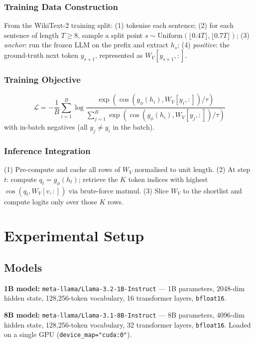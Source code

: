 \documentclass[twocolumn,10pt]{article}
\newcommand{\code}[1]{\texttt{#1}}
\begin{document}
\subsubsection{Training Data Construction}
From the WikiText-2 training split: (1) tokenise each sentence; (2) for each
sentence of length $T \geq 8$, sample a split point
$s \sim \text{Uniform}(\lfloor 0.4T\rfloor, \lfloor 0.7T\rfloor)$;
(3) \emph{anchor}: run the frozen LLM on the prefix and extract $h_s$;
(4) \emph{positive}: the ground-truth next token $y_{s+1}$, represented as
$W_V[y_{s+1},:]$.

\subsubsection{Training Objective}
\begin{equation}
  \mathcal{L} = -\frac{1}{B}\sum_{i=1}^{B}
    \log\frac{\exp(\cos(g_\phi(h_i),W_V[y_i,:])/\tau)}
             {\sum_{j=1}^{B}\exp(\cos(g_\phi(h_i),W_V[y_j,:])/\tau)}
\end{equation}
with in-batch negatives (all $y_j \neq y_i$ in the batch).

\subsubsection{Inference Integration}
(1) Pre-compute and cache all rows of $W_V$ normalised to unit length.
(2) At step $t$: compute $q_t = g_\phi(h_t)$; retrieve the $K$ token indices
with highest $\cos(q_t, W_V[v,:])$ via brute-force matmul.
(3) Slice $W_V$ to the shortlist and compute logits only over those $K$ rows.

\section{Experimental Setup}

\subsection{Models}
\textbf{1B model:} \code{meta-llama/Llama-3.2-1B-Instruct} --- 1B parameters,
2048-dim hidden state, 128,256-token vocabulary, 16 transformer layers,
\code{bfloat16}.

\textbf{8B model:} \code{meta-llama/Llama-3.1-8B-Instruct} --- 8B parameters,
4096-dim hidden state, 128,256-token vocabulary, 32 transformer layers,
\code{bfloat16}. Loaded on a single GPU (\code{device\_map="cuda:0"}).
\end{document}
